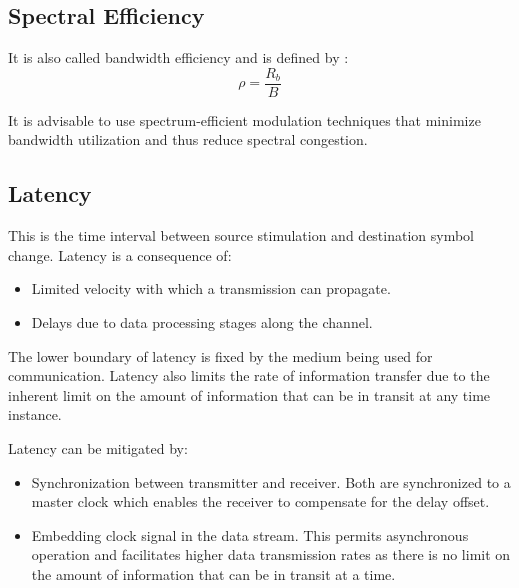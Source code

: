 \subsection{Spectral Efficiency}
It is also called bandwidth efficiency and is defined by \cite{hayk}:
\begin{equation}
	\rho = \frac{R_b}{B}
\end{equation}
\begin{mathDef}
\end{mathDef}
It is advisable to use spectrum-efficient modulation techniques that minimize bandwidth utilization and thus reduce spectral congestion\cite{AWGN}.

\subsection{Latency}
This is the time interval between source stimulation and destination symbol change. Latency is a consequence of:
\begin{itemize}
	\item Limited velocity with which a transmission can propagate.
	\item Delays due to data processing stages along the channel.
\end{itemize}
The lower boundary of latency is fixed by the medium being used for communication. Latency also limits the rate of information transfer due to the inherent limit on the amount of information that can be in transit at any time instance.

Latency can be mitigated by:
\begin{itemize}
	\item Synchronization between transmitter and receiver. Both are synchronized to a master clock which enables the receiver to compensate for the delay offset.
	\item Embedding clock signal in the data stream\cite{Proakis}. This permits asynchronous operation and facilitates higher data transmission rates as there is no limit on the amount of information that can be in transit at a time.
\end{itemize}
